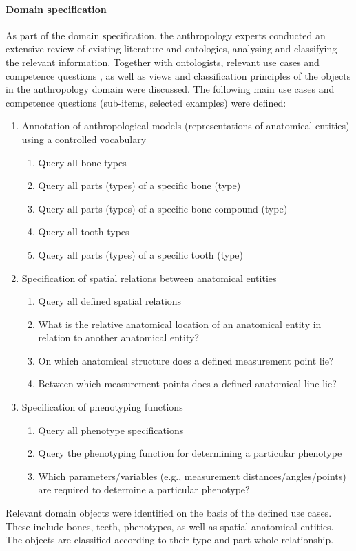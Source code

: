 \documentclass[sw]{iosart2x}
\begin{document}
\paragraph{Domain specification}
As part of the domain specification, the anthropology experts conducted an extensive review of existing literature and ontologies, analysing and classifying the relevant information.
Together with ontologists, relevant use cases and competence questions\footnotemark{} \citep{XD2016, MOMo2023}, as well as views and classification principles of the objects in the anthropology domain \citep{herre2010} were discussed.
%
The following main use cases and competence questions (sub-items, selected examples) were defined:
\begin{enumerate}
\item Annotation of anthropological models (representations of anatomical entities) using a controlled vocabulary
\begin{enumerate}
\item Query all bone types
\item Query all parts (types) of a specific bone (type)
\item Query all parts (types) of a specific bone compound (type)
\item Query all tooth types
\item Query all parts (types) of a specific tooth (type)
\end{enumerate}
\item Specification of spatial relations between anatomical entities
\begin{enumerate}
\item Query all defined spatial relations
\item What is the relative anatomical location of an anatomical entity in relation to another anatomical entity?
\item On which anatomical structure does a defined measurement point lie?
\item Between which measurement points does a defined anatomical line lie?
\end{enumerate}
\item Specification of phenotyping functions
\begin{enumerate}
\item Query all phenotype specifications
\item Query the phenotyping function for determining a particular phenotype
\item Which parameters/variables (e.g., measurement distances/angles/points) are required to determine a particular phenotype?
\end{enumerate}
\end{enumerate}
Relevant domain objects were identified on the basis of the defined use cases.
These include bones, teeth, phenotypes, as well as spatial anatomical entities.
The objects are classified according to their type and part-whole relationship.
\end{document}
